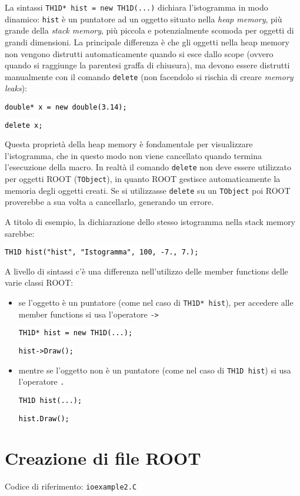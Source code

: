 \documentclass{article}
\newcommand{\ttt}{\texttt}
\newcommand{\tcpp}[1]{\hspace{10pt}\colorbox{background}{\textcolor{black}{\texttt{#1}}}}
\begin{document}
La sintassi \ttt{TH1D* hist = new TH1D(...)} dichiara l'istogramma in modo dinamico: \ttt{hist} è un puntatore ad un oggetto situato nella \textit{heap memory}, più grande della \textit{stack memory}, più piccola e potenzialmente scomoda per oggetti di grandi dimensioni.
La principale differenza è che gli oggetti nella heap memory non vengono distrutti automaticamente quando si esce dallo scope (ovvero quando si raggiunge la parentesi graffa di chiusura), ma devono essere distrutti manualmente con il comando \ttt{delete} (non facendolo si rischia di creare \textit{memory leaks}):

\tcpp{double* x = new double(3.14);}

\tcpp{delete x;}

Questa proprietà della heap memory è fondamentale per visualizzare l'istogramma, che in questo modo non viene cancellato quando termina l'esecuzione della macro.
In realtà il comando \ttt{delete} non deve essere utilizzato per oggetti ROOT (\texttt{TObject}), in quanto ROOT gestisce automaticamente la memoria degli oggetti creati.
Se si utilizzasse \ttt{delete} su un \ttt{TObject} poi ROOT proverebbe a sua volta a cancellarlo, generando un errore.

A titolo di esempio, la dichiarazione dello stesso istogramma nella stack memory sarebbe:

\tcpp{TH1D hist("hist", "Istogramma", 100, -7., 7.);}

\newpage
A livello di sintassi c'è una differenza nell'utilizzo delle member functions delle varie classi ROOT:
\begin{itemize}
    \item se l'oggetto è un puntatore (come nel caso di \ttt{TH1D* hist}), per accedere alle member functions si usa l'operatore \ttt{->}

    \tcpp{TH1D* hist = new TH1D(...);}

    \tcpp{hist->Draw();}

    \vspace{10pt}

    \item mentre se l'oggetto non è un puntatore (come nel caso di \ttt{TH1D hist}) si usa l'operatore \ttt{.}

    \tcpp{TH1D hist(...);}

    \tcpp{hist.Draw();}

\end{itemize}
\section{Creazione di file ROOT}
Codice di riferimento: \ttt{ioexample2.C} \vspace{10pt}
\end{document}
